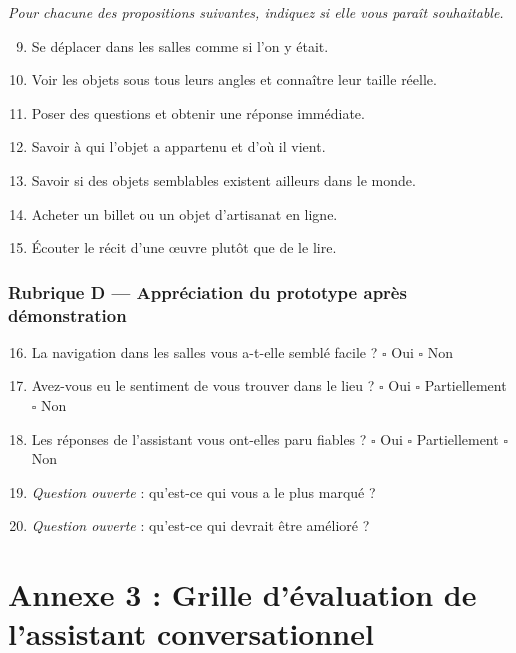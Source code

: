 \emph{Pour chacune des propositions suivantes, indiquez si elle vous paraît
souhaitable.}

\begin{enumerate}\setcounter{enumi}{8}
  \item Se déplacer dans les salles comme si l'on y était.
  \item Voir les objets sous tous leurs angles et connaître leur taille réelle.
  \item Poser des questions et obtenir une réponse immédiate.
  \item Savoir à qui l'objet a appartenu et d'où il vient.
  \item Savoir si des objets semblables existent ailleurs dans le monde.
  \item Acheter un billet ou un objet d'artisanat en ligne.
  \item Écouter le récit d'une œuvre plutôt que de le lire.
\end{enumerate}

\subsection*{Rubrique D — Appréciation du prototype après démonstration}

\begin{enumerate}\setcounter{enumi}{15}
  \item La navigation dans les salles vous a-t-elle semblé facile ? \quad
        $\square$ Oui \quad $\square$ Non
  \item Avez-vous eu le sentiment de vous trouver dans le lieu ? \quad
        $\square$ Oui \quad $\square$ Partiellement \quad $\square$ Non
  \item Les réponses de l'assistant vous ont-elles paru fiables ? \quad
        $\square$ Oui \quad $\square$ Partiellement \quad $\square$ Non
  \item \emph{Question ouverte} : qu'est-ce qui vous a le plus marqué ?
  \item \emph{Question ouverte} : qu'est-ce qui devrait être amélioré ?
\end{enumerate}

\cleardoublepage
\chapter*{Annexe 3 : Grille d'évaluation de l'assistant conversationnel}
\label{ann:grille}

